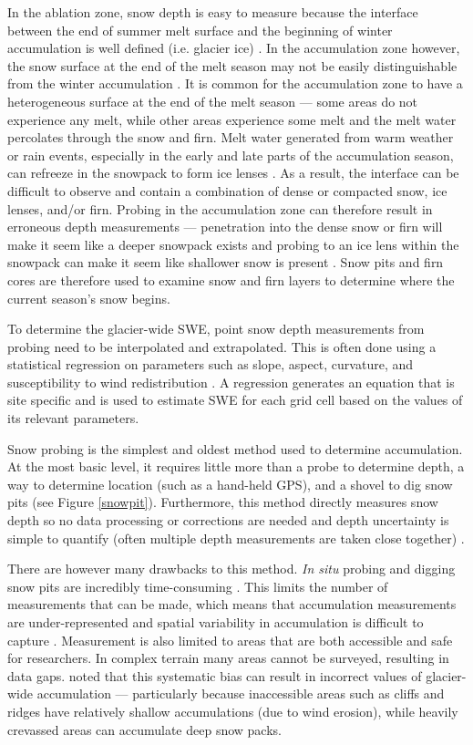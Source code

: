 \documentclass{sfuthesis}
\begin{document}
In the ablation zone, snow depth is easy to measure because the interface between the end of summer melt surface and the beginning of winter accumulation is well defined (i.e. glacier ice) \citep{McGrath2015}. In the accumulation zone however, the snow surface at the end of the melt season may not be easily distinguishable from the winter accumulation \citep{Grunewald2010}. It is common for the accumulation zone to have a heterogeneous surface at the end of the melt season --- some areas do not experience any melt,  while other areas experience some melt and the melt water percolates through the snow and firn. Melt water generated from warm weather or rain events, especially in the early and late parts of the accumulation season, can refreeze in the snowpack to form ice lenses \citep{Sold2014}. As a result, the interface can be difficult to observe and contain a combination of dense or compacted snow, ice lenses, and/or firn.  Probing in the accumulation zone can therefore result in erroneous depth measurements --- penetration into the dense snow or firn will make it seem like a deeper snowpack exists and probing to an ice lens within the snowpack can make it seem like shallower snow is present \citep{Sold2013}. Snow pits and firn cores are therefore used to examine snow and firn layers to determine where the current season's snow begins.

To determine the glacier-wide SWE, point snow depth measurements from probing need to be interpolated and extrapolated. This is often done using a statistical regression on parameters such as slope, aspect, curvature, and susceptibility to wind redistribution \citep[e.g.][]{Wheler2014,McGrath2015}. A regression generates an equation that is site specific and is used to estimate SWE for each grid cell based on the values of its relevant parameters. 

Snow probing is the simplest and oldest method used to determine accumulation. At the most basic level, it requires little more than a probe to determine depth, a way to determine location (such as a hand-held GPS), and a shovel to dig snow pits (see Figure \ref{snowpit}). Furthermore, this method directly measures snow depth so no data processing or corrections are needed and depth uncertainty is simple to quantify (often multiple depth measurements are taken close together) \citep{Sold2013}. 

There are however many drawbacks to this method. \textit{In situ} probing and digging snow pits are incredibly time-consuming \citep{Deems2006}. This limits the number of measurements that can be made, which means that accumulation measurements are under-represented and spatial variability in accumulation is difficult to capture \citep{Sold2014}. Measurement is also limited to areas that are both accessible and safe for researchers. In complex terrain many areas cannot be surveyed, resulting in data gaps. \cite{Sold2013} noted that this systematic bias can result in incorrect values of glacier-wide accumulation --- particularly because inaccessible areas such as cliffs and ridges have relatively shallow accumulations (due to wind erosion), while heavily crevassed areas can accumulate deep snow packs. 
\end{document}

